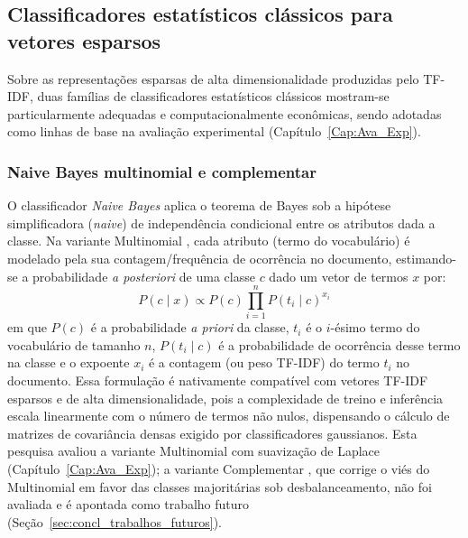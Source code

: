 \subsection{Classificadores estatísticos clássicos para vetores esparsos}
Sobre as representações esparsas de alta dimensionalidade produzidas pelo TF-IDF, duas famílias de classificadores estatísticos clássicos mostram-se particularmente adequadas e computacionalmente econômicas, sendo adotadas como linhas de base na avaliação experimental (Capítulo~\ref{Cap:Ava_Exp}).

\subsubsection{Naive Bayes multinomial e complementar}
\label{sec:fund_naive_bayes}
O classificador \textit{Naive Bayes} aplica o teorema de Bayes sob a hipótese simplificadora (\textit{naive}) de independência condicional entre os atributos dada a classe. Na variante Multinomial \cite{mccallum1998comparison}, cada atributo (termo do vocabulário) é modelado pela sua contagem/frequência de ocorrência no documento, estimando-se a probabilidade \textit{a posteriori} de uma classe $c$ dado um vetor de termos $x$ por:
\begin{equation}
	P(c \mid x) \propto P(c) \prod_{i=1}^{n} P(t_i \mid c)^{x_i}
\end{equation}
em que $P(c)$ é a probabilidade \textit{a priori} da classe, $t_i$ é o $i$-ésimo termo do vocabulário de tamanho $n$, $P(t_i \mid c)$ é a probabilidade de ocorrência desse termo na classe e o expoente $x_i$ é a contagem (ou peso TF-IDF) do termo $t_i$ no documento. Essa formulação é nativamente compatível com vetores TF-IDF esparsos e de alta dimensionalidade, pois a complexidade de treino e inferência escala linearmente com o número de termos não nulos, dispensando o cálculo de matrizes de covariância densas exigido por classificadores gaussianos. Esta pesquisa avaliou a variante Multinomial com suavização de Laplace (Capítulo~\ref{Cap:Ava_Exp}); a variante Complementar \cite{rennie2003tackling}, que corrige o viés do Multinomial em favor das classes majoritárias sob desbalanceamento, não foi avaliada e é apontada como trabalho futuro (Seção~\ref{sec:concl_trabalhos_futuros}).

